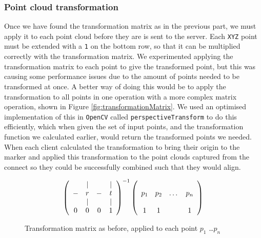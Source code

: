 \documentclass{article}
\begin{document}
\subsubsection{Point cloud transformation}
Once we have found the transformation matrix as in the previous part, we must apply it to each point cloud before they are is sent to the server. Each \texttt{XYZ} point must be extended with a \texttt{1} on the bottom row, so that it can be multiplied correctly with the transformation matrix. We experimented applying the transformation matrix to each point to give the transformed point, but this was causing some performance issues due to the amount of points needed to be transformed at once. A better way of doing this would be to apply the transformation to all points in one operation with a more complex matrix operation, shown in Figure \ref{fig:transformationMatrix}. We used an optimised implementation of this in \texttt{OpenCV} \cite{opencv} called \texttt{perspectiveTransform} to do this efficiently, which when given the set of input points, and the transformation function we calculated earlier, would return the transformed points we needed. When each client calculated the transformation to bring their origin to the marker and applied this transformation to the point clouds captured from the connect so they could be successfully combined such that they would align.\\
\begin{figure}[h]
  \[\left(\begin{array}{cccc}
      & | &   & | \\
    - & r & - & t \\ 
      & | &   & | \\
    0 & 0 & 0 & 1
    \end{array}\right)^{-1}
  \left(\begin{array}{cccc}
    \multirow{3}{*}{\textbf{$p_1$}} & \multirow{3}{*}{\textbf{$p_2$}} & \multirow{3}{*}{\dots} & \multirow{3}{*}{\textbf{$p_n$}} \\
    & & & \\
    & & & \\
    1 & 1 & & 1
    \end{array}\right)\]
  \caption{Transformation matrix as before, applied to each point $p_1$ \dots $p_n$}
  \label{fig:transformationApplication}
\end{figure}
\end{document}
